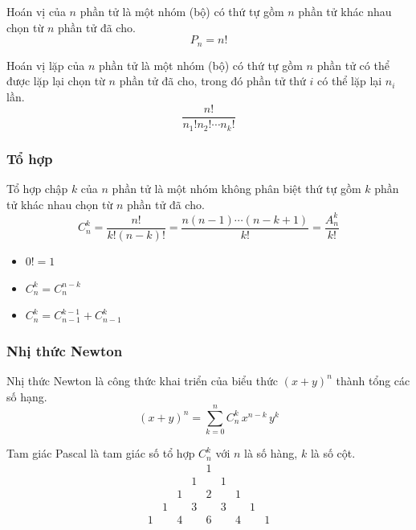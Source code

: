 \documentclass[12pt,a4paper]{article}
\begin{document}
\begin{dinhnghia}[title={Hoán vị}]
Hoán vị của $n$ phần tử là một nhóm (bộ) có thứ tự gồm $n$ phần tử khác nhau chọn từ $n$ phần tử đã cho.
\[
  P_n = n!
\]
\end{dinhnghia}

\begin{dinhnghia}[title={Hoán vị lặp}]
  Hoán vị lặp của $n$ phần tử là một nhóm (bộ) có thứ tự gồm $n$ phần tử có thể được lặp lại chọn từ $n$ phần tử đã cho, trong đó phần tử thứ $i$ có thể lặp lại $n_i$ lần.
  \[
    \dfrac{n!}{n_1! n_2! \cdots n_k!}
  \]
\end{dinhnghia}

\subsubsection{Tổ hợp}

\begin{dinhnghia}
Tổ hợp chập $k$ của $n$ phần tử là một nhóm không phân biệt thứ tự gồm $k$ phần tử khác nhau chọn từ $n$ phần tử đã cho.
\[
  C_n^k = \dfrac{n!}{k!(n-k)!} = \dfrac{n(n-1)\cdots(n-k+1)}{k!} = \dfrac{A_n^k}{k!}
\]
\end{dinhnghia}

\begin{tinhchat}
\begin{itemize}
  \item $0! = 1$
  \item $C_n^k = C_n^{n-k}$
  \item $C_n^k = C_{n-1}^{k-1} + C_{n-1}^k$
\end{itemize}
\end{tinhchat}

\subsubsection{Nhị thức Newton}

\begin{dinhnghia}
  Nhị thức Newton là công thức khai triển của biểu thức $(x + y)^n$ thành tổng các số hạng.
  \[
    (x + y)^n = \displaystyle\sum_{k=0}^{n} C_n^k\, x^{n-k}\, y^k
  \]
\end{dinhnghia}

\begin{dinhnghia}[title={Tam giác Pascal}]
Tam giác Pascal là tam giác số tổ hợp $C_n^k$ với $n$ là số hàng, $k$ là số cột.
\[
  \begin{array}{ccccccccc}
    &   &   &   & 1 &   &   &   &   \\
    &   &   & 1 &   & 1 &   &   &   \\
    &   & 1 &   & 2 &   & 1 &   &   \\
    & 1 &   & 3 &   & 3 &   & 1 &   \\
    1 &   & 4 &   & 6 &   & 4 &   & 1 \\
  \end{array}
\]
\end{dinhnghia}
\end{document}
